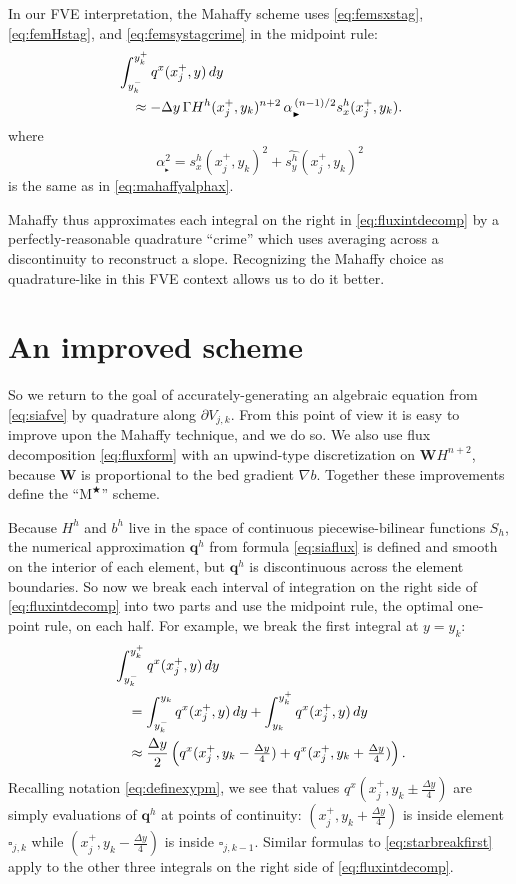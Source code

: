 \documentclass[twocolumn,letterpaper]{igs}
\newcommand\bq{\mathbf{q}}
\newcommand\bW{\mathbf{W}}
\newcommand{\grad}{\nabla}
\newcommand{\Mstar}{$\text{M}^{\bigstar}$\xspace}
\newcommand\alpharight{\alpha_{{}_{\blacktriangleright}}}
\begin{document}
In our FVE interpretation, the Mahaffy scheme uses \eqref{eq:femsxstag}, \eqref{eq:femHstag}, and \eqref{eq:femsystagcrime} in the midpoint rule:
\begin{align}
&\int_{y_k^-}^{y_k^+} q^x(x_j^+,y)\,dy  \label{eq:femmahaffyfirstint} \\
  &\quad\approx - \Delta y\, \Gamma H^h(x_j^+,y_k)^{n+2} \,\alpharight^{\,(n-1)/2} s^h_x(x_j^+,y_k). \notag 
\end{align}
where
\begin{equation}
\alpharight^2 = s^h_x(x_j^+,y_k)^2 + \widehat{s^h_y}(x_j^+,y_k)^2
\end{equation}
is the same as in \eqref{eq:mahaffyalphax}.

Mahaffy thus approximates each integral on the right in \eqref{eq:fluxintdecomp} by a perfectly-reasonable quadrature ``crime'' \citep[compare][]{Strang1972} which uses averaging across a discontinuity to reconstruct a slope.  Recognizing the Mahaffy choice as quadrature-like in this FVE context allows us to do it better.


\section{An improved scheme}  \label{sec:star}

So we return to the goal of accurately-generating an algebraic equation from \eqref{eq:siafve} by quadrature along $\partial V_{j,k}$.  From this point of view it is easy to improve upon the Mahaffy technique, and we do so.  We also use flux decomposition \eqref{eq:fluxform} with an upwind-type discretization on $\bW H^{n+2}$, because $\bW$ is proportional to the bed gradient $\grad b$.  Together these improvements define the ``\Mstar'' scheme.

Because $H^h$ and $b^h$ live in the space of continuous piecewise-bilinear functions $S_h$, the numerical approximation $\bq^h$ from formula \eqref{eq:siaflux} is defined and smooth on the interior of each element, but $\bq^h$ is discontinuous across the element boundaries.  So now we break each interval of integration on the right side of \eqref{eq:fluxintdecomp} into two parts and use the midpoint rule, the optimal one-point rule, on each half.  For example, we break the first integral at $y=y_k$:
\begin{align}
&\int_{y_k^-}^{y_k^+} q^x(x_j^+,y)\,dy  \label{eq:starbreakfirst} \\
  &\quad= \int_{y_k^-}^{y_k} q^x(x_j^+,y)\,dy + \int_{y_k}^{y_k^+} q^x(x_j^+,y)\,dy \notag \\
  &\quad\approx \frac{\Delta y}{2} \left(q^x(x_j^+,y_k-\tfrac{\Delta y}{4}) + q^x(x_j^+,y_k+\tfrac{\Delta y}{4})\right). \notag
\end{align}
Recalling notation \eqref{eq:definexypm}, we see that values $q^x(x_j^+,y_k\pm\tfrac{\Delta y}{4})$ are simply evaluations of $\bq^h$ at points of continuity: $(x_j^+,y_k+\tfrac{\Delta y}{4})$ is inside element $\square_{j,k}$ while $(x_j^+,y_k-\tfrac{\Delta y}{4})$ is inside $\square_{j,k-1}$.  Similar formulas to \eqref{eq:starbreakfirst} apply to the other three integrals on the right side of \eqref{eq:fluxintdecomp}.
\end{document}
